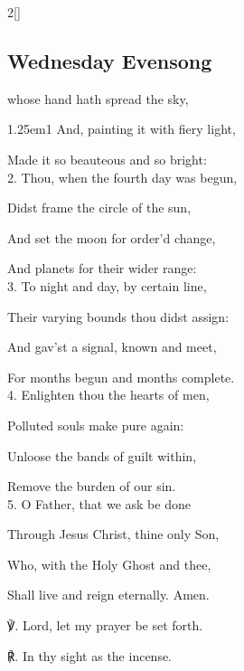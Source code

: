\begin{paracol}{2}[]
\switchcolumn

\subsection{Wednesday Evensong}\label{WednesdayEvensong}

 whose hand hath spread the sky,


\begin{hangparas}{1.25em}{1}
And, painting it with fiery light,

Made it so beauteous and so bright:\\

2. Thou, when the fourth day was begun,

Didst frame the circle of the sun,

And set the moon for order'd change,

And planets for their wider range:\\

3. To night and day, by certain line,

Their varying bounds thou didst assign:

And gav'st a signal, known and meet,

For months begun and months complete.\\

4. Enlighten thou the hearts of men,

Polluted souls make pure again:

Unloose the bands of guilt within,

Remove the burden of our sin.\\

5. O Father, that we ask be done

Through Jesus Christ, thine only Son,

Who, with the Holy Ghost and thee,

Shall live and reign eternally. Amen.\\
\end{hangparas}

℣. Lord, let my prayer be set forth.

℟. In thy sight as the incense.


\fussy
\end{paracol}

